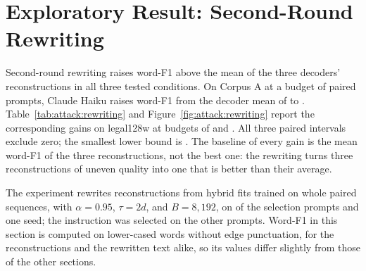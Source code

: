 \section{Exploratory Result: Second-Round Rewriting}\label{sec:attack:rewriting}

Second-round rewriting raises word-F1 above the mean of the three decoders' reconstructions in all three tested conditions.
On Corpus A at a budget of  paired prompts, Claude Haiku raises word-F1 from the decoder mean of  to . %
Table~\ref{tab:attack:rewriting} and Figure~\ref{fig:attack:rewriting} report the corresponding gains on legal128w at budgets of  and .
All three paired intervals exclude zero; the smallest lower bound is .
The baseline of every gain is the mean word-F1 of the three reconstructions, not the best one: the rewriting turns three reconstructions of uneven quality into one that is better than their average.

The experiment rewrites reconstructions from hybrid fits trained on whole paired sequences, with $\alpha = 0.95$, $\tau = 2d$, and $B = 8{,}192$, on  of the  selection prompts and one seed; the instruction was selected on the other  prompts. %
Word-F1 in this section is computed on lower-cased words without edge punctuation, for the reconstructions and the rewritten text alike, so its values differ slightly from those of the other sections. %

